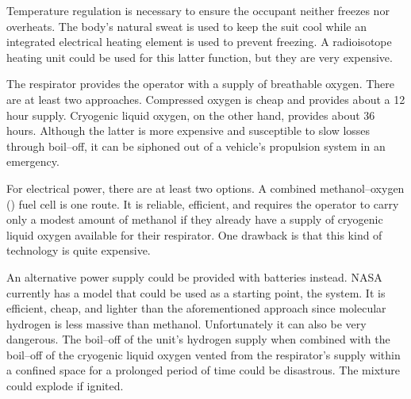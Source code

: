 Temperature regulation is necessary to ensure the occupant neither freezes nor overheats. The body's natural sweat is used to keep the suit cool while an integrated electrical heating element is used to prevent freezing. A radioisotope heating unit could be used for this latter function, but they are very expensive.

The respirator provides the operator with a supply of breathable oxygen. There are at least two approaches. Compressed oxygen is cheap and provides about a 12 hour supply. Cryogenic liquid oxygen, on the other hand, provides about 36 hours. Although the latter is more expensive and susceptible to slow losses through boil--off, it can be siphoned out of a vehicle's propulsion system in an emergency.

For electrical power, there are at least two options. A combined methanol--oxygen () fuel cell is one route. It is reliable, efficient, and requires the operator to carry only a modest amount of methanol if they already have a supply of cryogenic liquid oxygen available for their respirator. One drawback is that this kind of technology is quite expensive.

An alternative power supply could be provided with batteries instead. NASA currently has a model that could be used as a starting point, the  system. It is efficient, cheap, and lighter than the aforementioned approach since molecular hydrogen is less massive than methanol. Unfortunately it can also be very dangerous. The boil--off of the unit's hydrogen supply when combined with the boil--off of the cryogenic liquid oxygen vented from the respirator's supply within a confined space for a prolonged period of time could be disastrous. The mixture could explode if ignited.

